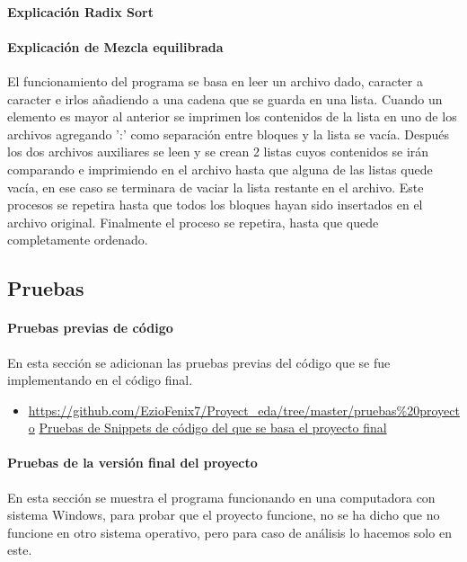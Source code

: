 \documentclass{article}
\begin{document}
	\paragraph*{Explicación Radix Sort}
	
	\paragraph*{Explicación de Mezcla equilibrada}
	El funcionamiento del programa se basa en leer un archivo dado, caracter a caracter e irlos añadiendo a una cadena que se guarda en una lista. 
	Cuando un elemento es mayor al anterior se imprimen los contenidos de la lista en uno de los archivos agregando ':' como separación entre bloques y la lista se vacía. 
	Después los dos archivos auxiliares se leen y se crean 2 listas cuyos contenidos se irán comparando e imprimiendo en el archivo hasta que alguna de las listas quede vacía, 
	en ese caso se terminara de vaciar la lista restante en el archivo. Este procesos se repetira hasta que todos los bloques hayan sido insertados en el archivo original. 
	Finalmente el proceso se repetira, hasta que quede completamente ordenado.
	
	\subsection{Pruebas}
		\paragraph*{Pruebas previas de código}
		En esta sección se adicionan las pruebas previas del código que se fue implementando en el código final.
		
			\begin{itemize}
				\item \url{https://github.com/EzioFenix7/Proyect_eda/tree/master/pruebas\%20proyecto}
				\href{https://github.com/EzioFenix7/Proyect_eda/tree/master/pruebas\%20proyecto}{ Pruebas de Snippets de código del que se basa el proyecto final}
			\end{itemize}
		
		\paragraph*{Pruebas de la versión final del proyecto}
		En esta sección se muestra el programa funcionando en una computadora con sistema Windows, para probar que el proyecto funcione, no se ha dicho que no funcione en otro sistema operativo, pero para caso de análisis lo hacemos solo en este.
		
\end{document}
